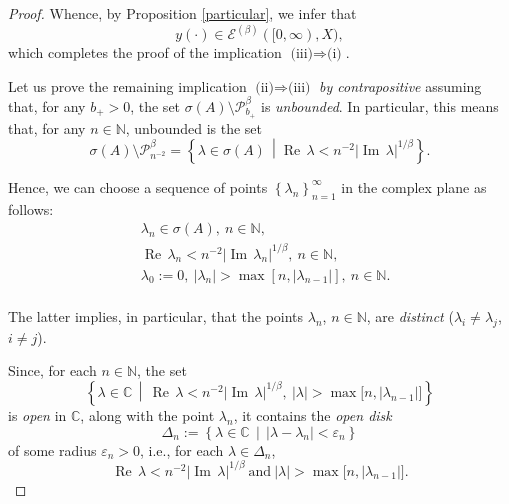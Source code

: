 \documentclass{amsart}
\theoremstyle{plain}
\theoremstyle{definition}
\begin{document}
\begin{proof}
Whence, by Proposition \ref{particular}, we infer that
\begin{equation*}
y(\cdot) \in {\mathscr E}^{(\beta )}([0,\infty),X),
\end{equation*}
which completes the proof of the implication $\text{(iii)}\Rightarrow \text{(i)}$.

\medskip
Let us prove the remaining implication $\text{(ii)}\Rightarrow \text{(iii)}$ {\it by contrapositive} assuming that, for any $b_+>0$, the set 
$\sigma(A)\setminus {\mathscr P}_{b_+}^\beta$ is \textit{unbounded}. In particular, this means that, for any $n\in {{\mathbb N}}$, unbounded is the set
\begin{equation*}
\sigma(A)\setminus {\mathscr P}^\beta_{n^{-2}}=
\left\{ \lambda \in \sigma(A)\,\middle| 
\operatorname{Re\,}\lambda < n^{-2}|\operatorname{Im\,}\lambda|^{1/\beta}\right\}.
\end{equation*} 

Hence, we can choose a sequence of points $\left\{\lambda_n\right\}_{n=1}^\infty$ 
in the complex plane as follows:
\begin{equation*}
\begin{split}
&\lambda_n \in \sigma(A),\ n\in {{\mathbb N}},\\
&\operatorname{Re\,}\lambda_n <n^{-2}|\operatorname{Im\,}\lambda_n|^{1/\beta},\ n\in {{\mathbb N}},\\
&\lambda_0:=0,\ |\lambda_n|>\max\left[n,|\lambda_{n-1}|\right],\ n\in {{\mathbb N}}.\\
\end{split}
\end{equation*}

The latter implies, in particular, that the points $\lambda_n$, $n\in{{\mathbb N}}$, are \textit{distinct} ($\lambda_i \neq \lambda_j$, $i\neq j$).

Since, for each $n\in {{\mathbb N}}$, the set
\begin{equation*}
\left\{ \lambda \in {\mathbb C}\,\middle|\, 
\operatorname{Re\,}\lambda <n^{-2}|\operatorname{Im\,}\lambda|^{1/\beta},\
|\lambda|>\max\bigl[n,|\lambda_{n-1}|\bigr]\right\}
\end{equation*}
is {\it open} in ${{\mathbb C}}$, along with the point $\lambda_n$, it contains the {\it open disk}
\begin{equation*}
\Delta_n:=\left\{\lambda \in {{\mathbb C}}\, \middle|\,|\lambda-\lambda_n|<\varepsilon_n \right\}
\end{equation*} 
of some radius $\varepsilon_n>0$, i.e., for each $\lambda \in \Delta_n$,
\begin{equation}\label{disks1}
\operatorname{Re\,}\lambda < n^{-2}|\operatorname{Im\,}\lambda|^{1/\beta}\ \text{and}\ |\lambda|>\max\bigl[n,|\lambda_{n-1}|\bigr].
\end{equation}


\end{proof}
\end{document}
